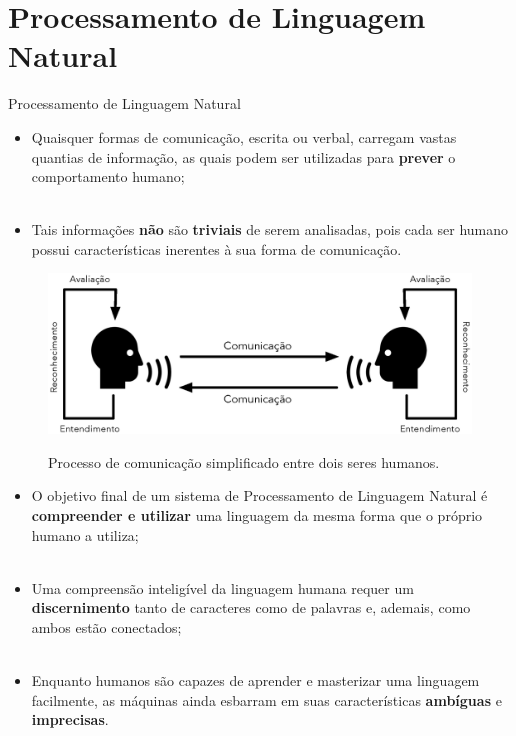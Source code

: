 \section{Processamento de Linguagem Natural}
\label{s.nlp}

\begin{frame}{Processamento de Linguagem Natural}
	\begin{itemize}
		\justifying	
		\item Quaisquer formas de comunicação, escrita ou verbal, carregam vastas quantias de informação, as quais podem ser utilizadas para \textbf{prever} o comportamento humano;
		\\~\\
		\item Tais informações \textbf{não} são \textbf{triviais} de serem analisadas, pois cada ser humano possui características inerentes à sua forma de comunicação.
	\end{itemize}
\end{frame}

\begin{frame}
	\begin{figure}[!ht]
		\centering
		\includegraphics[scale=0.45]{figs/speech_workflow.eps}	
		\label{f.speech_workflow}
		\caption{Processo de comunicação simplificado entre dois seres humanos.}
	\end{figure}
\end{frame}

\begin{frame}
	\begin{itemize}
		\justifying
		\item O objetivo final de um sistema de Processamento de Linguagem Natural é \textbf{compreender e utilizar} uma linguagem da mesma forma que o próprio humano a utiliza;
		\\~\\
		\item Uma compreensão inteligível da linguagem humana requer um \textbf{discernimento} tanto de caracteres como de palavras e, ademais, como ambos estão conectados;
		\\~\\
		\item Enquanto humanos são capazes de aprender e masterizar uma linguagem facilmente, as máquinas ainda esbarram em suas características \textbf{ambíguas} e \textbf{imprecisas}.
	\end{itemize}
\end{frame}

